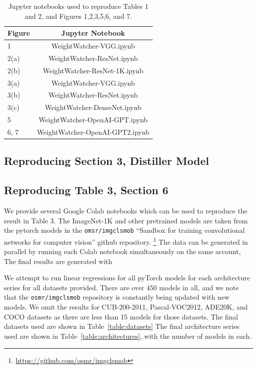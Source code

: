 \begin{table}[t]
\small
\begin{center}
\begin{tabular}{|p{1in}|c|}
\hline
Figure & Jupyter Notebook \\
\hline
1  &  WeightWatcher-VGG.ipynb \\
2(a)  &  WeightWatcher-ResNet.ipynb \\
2(b)  &  WeightWatcher-ResNet-1K.ipynb \\
3(a)  &  WeightWatcher-VGG.ipynb \\
3(b)  &  WeightWatcher-ResNet.ipynb \\
3(c)  &  WeightWatcher-DenseNet.ipynb \\
\hline
5 & WeightWatcher-OpenAI-GPT.ipynb \\
6, 7 & WeightWatcher-OpenAI-GPT2.ipynb \\
\hline
\end{tabular}
\end{center}
\caption{Jupyter notebooks used to reproduce Tables 1 and 2, and Figures 1,2,3,5,6, and 7.}
\label{table:notebooks}
\end{table}

\subsection{Reproducing Section 3, Distiller Model}


\subsection{Reproducing Table 3, Section 6}

We provide several Google Colab notebooks which can be used to reproduce the result in Table 3.
The ImageNet-1K and other pretrained models are taken from the pytorch models in the \texttt{omsr/imgclsmob} 
``Sandbox for training convolutional networks for computer vision'' github repository.
\footnote{\url{https://github.com/osmr/imgclsmob}}
The data can be generated in parallel by running each Colab notebook simultaneously on the same account,
The final results are generated with 

We attempt to run linear regressions for all pyTorch models for each architecture series for all datasets provided.  
There are over $450$ models in all, and we note that the \texttt{osmr/imgclsmob} repository is constantly being updated with new models.
We omit the results for CUB-200-2011, Pascal-VOC2012, ADE20K, and COCO datasets as there are less than 15 models
for those datasets. The final datasets used are shown in Table~\ref{table:datasets}
The final architecture series used are shown in  Table~\ref{table:architectures}, with the number of models in each.

